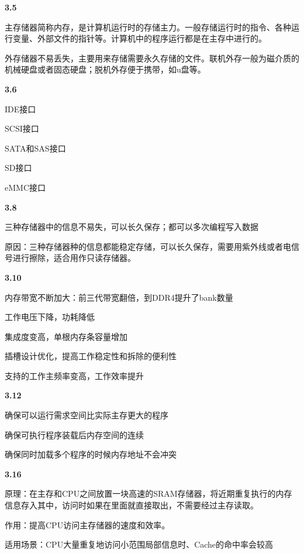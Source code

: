 \documentclass{article}
\begin{document}
    \noindent\textbf{3.5}\par
    主存储器简称内存，是计算机运行时的存储主力。一般存储运行时的指令、各种运行变量、外部文件的指针等。计算机中的程序运行都是在主存中进行的。\par
    外存储器不易丢失，主要用来存储需要永久存储的文件。联机外存一般为磁介质的机械硬盘或者固态硬盘；脱机外存便于携带，如u盘等。
    \\[4pt]\par

    \noindent\textbf{3.6}\par
    IDE接口\par
    SCSI接口\par
    SATA和SAS接口\par
    SD接口\par
    eMMC接口
    \\[4pt]\par

    \noindent\textbf{3.8}\par
    三种存储器中的信息不易失，可以长久保存；都可以多次编程写入数据\par
    原因：三种存储器种的信息都能稳定存储，可以长久保存，需要用紫外线或者电信号进行擦除，适合用作只读存储器。
    \\[4pt]\par

    \noindent\textbf{3.10}\par
    内存带宽不断加大：前三代带宽翻倍，到DDR4提升了bank数量\par
    工作电压下降，功耗降低\par
    集成度变高，单根内存条容量增加\par
    插槽设计优化，提高工作稳定性和拆除的便利性\par
    支持的工作主频率变高，工作效率提升
    \\[4pt]\par

    \noindent\textbf{3.12}\par
    确保可以运行需求空间比实际主存更大的程序\par
    确保可执行程序装载后内存空间的连续\par
    确保同时加载多个程序的时候内存地址不会冲突
    \\[4pt]\par

    \noindent\textbf{3.16}\par
    原理：在主存和CPU之间放置一块高速的SRAM存储器，将近期重复执行的内存信息存入其中，访问时如果在里面就直接取出，不需要经过主存读取。\par
    作用：提高CPU访问主存储器的速度和效率。\par
    适用场景：CPU大量重复地访问小范围局部信息时、Cache的命中率会较高
    \\[4pt]\par
\end{document}
